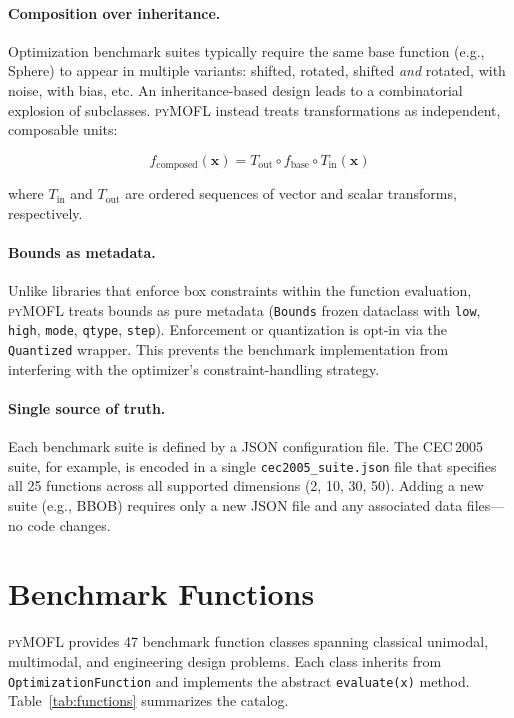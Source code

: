 \documentclass[11pt,a4paper]{article}
\newcommand{\pymofl}{\textsc{pyMOFL}}
\begin{document}
\paragraph{Composition over inheritance.}
Optimization benchmark suites typically require the same base function
(e.g., Sphere) to appear in multiple variants: shifted, rotated, shifted
\emph{and} rotated, with noise, with bias, etc. An inheritance-based design
leads to a combinatorial explosion of subclasses. \pymofl{} instead treats
transformations as independent, composable units:

\begin{equation}
f_{\text{composed}}(\mathbf{x}) = T_{\text{out}} \circ f_{\text{base}} \circ T_{\text{in}}(\mathbf{x})
\label{eq:composition}
\end{equation}

\noindent where $T_{\text{in}}$ and $T_{\text{out}}$ are ordered sequences of
vector and scalar transforms, respectively.

\paragraph{Bounds as metadata.}
Unlike libraries that enforce box constraints within the function evaluation,
\pymofl{} treats bounds as pure metadata
(\texttt{Bounds} frozen dataclass with \texttt{low}, \texttt{high}, \texttt{mode},
\texttt{qtype}, \texttt{step}). Enforcement or quantization is opt-in via
the \texttt{Quantized} wrapper. This prevents the benchmark implementation from
interfering with the optimizer's constraint-handling strategy.

\paragraph{Single source of truth.}
Each benchmark suite is defined by a JSON configuration file. The CEC\,2005
suite, for example, is encoded in a single \texttt{cec2005\_suite.json} file
that specifies all 25 functions across all supported dimensions (2, 10, 30, 50).
Adding a new suite (e.g., BBOB) requires only a new JSON file and any associated
data files---no code changes.

\section{Benchmark Functions}\label{sec:functions}

\pymofl{} provides 47 benchmark function classes spanning classical unimodal,
multimodal, and engineering design problems. Each class inherits from
\texttt{OptimizationFunction} and implements the abstract \texttt{evaluate(x)}
method. Table~\ref{tab:functions} summarizes the catalog.
\end{document}
